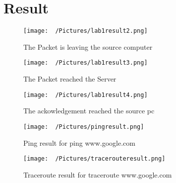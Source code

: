 \documentclass{article}
\begin{document}
\section{Result}
\begin{figure}[H]
    \centering
    \texttt{[image: ~/Pictures/lab1result2.png]}
    \caption{The Packet is leaving the source computer}
\end{figure}
\begin{figure}[H]
    \centering
    \texttt{[image: ~/Pictures/lab1result3.png]}
    \caption{The Packet reached the Server}
\end{figure}
\begin{figure}[H]
    \centering
    \texttt{[image: ~/Pictures/lab1result4.png]}
    \caption{The ackowledgement reached the source pc}
\end{figure}
\begin{figure}[H]
    \centering
    \texttt{[image: ~/Pictures/pingresult.png]}
    \caption{Ping result for ping www.google.com}
\end{figure}
\begin{figure}[H]
    \centering
    \texttt{[image: ~/Pictures/tracerouteresult.png]}
    \caption{Traceroute result for traceroute www.google.com}
\end{figure}
\end{document}
